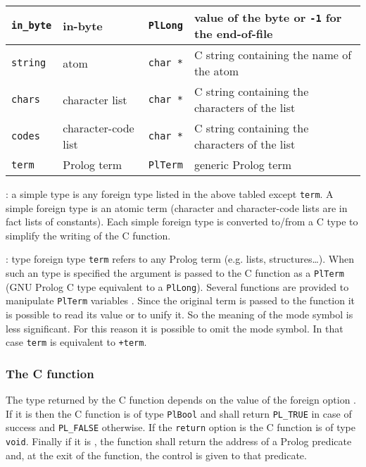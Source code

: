 \begin{tabular}{|l|l|l|l|}
\hline

\texttt{in\_byte} & in-byte & \texttt{PlLong} & value of the byte or
\texttt{-1} for the end-of-file \\

\hline

\texttt{string} & atom & \texttt{char *} & C string containing the name of
the atom \\

\hline

\texttt{chars} & character list & \texttt{char *} & C string containing the
characters of the list \\

\hline

\texttt{codes} & character-code list & \texttt{char *} & C string containing
the characters of the list \\

\hline

\texttt{term} & Prolog term & \texttt{PlTerm} & generic Prolog term \\

\hline
\end{tabular}

: a simple type is any foreign type listed in
the above tabled except \texttt{term}. A simple foreign type is an atomic
term (character and character-code lists are in fact lists of constants).
Each simple foreign type is converted to/from a C type to simplify the
writing of the C function.

: type foreign type \texttt{term} refers to any
Prolog term (e.g. lists, structures\ldots). When such an type is
specified the argument is passed to the C function as a \texttt{PlTerm}
(GNU Prolog C type equivalent to a \texttt{PlLong}). Several functions are
provided to manipulate \texttt{PlTerm} variables . 
Since the original term is passed to the function it is
possible to read its value or to unify it. So the meaning of the mode symbol
is less significant. For this reason it is possible to omit the mode symbol.
In that case \texttt{term} is equivalent to \texttt{+term}.

\subsubsection{The C function}

The type returned by the C function depends on the value of the
 foreign option . If it is
 then the C function is of type \texttt{PlBool} and shall
return \texttt{PL\_TRUE} in case of success and \texttt{PL\_FALSE}
otherwise. If the \texttt{return} option is  the C function is of
type \texttt{void}. Finally if it is , the function shall return
the address of a Prolog predicate and, at the exit of the function, the
control is given to that predicate.

